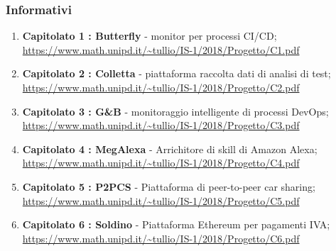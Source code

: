 			\subsubsection{Informativi}
				\begin{enumerate}
					\item \textbf{Capitolato 1 : Butterfly} - monitor per processi CI/CD;
						\newline
						\url{ https://www.math.unipd.it/~tullio/IS-1/2018/Progetto/C1.pdf}
					\item \textbf{Capitolato 2 : Colletta} - piattaforma raccolta dati di analisi di test;
						\newline
						\url{https://www.math.unipd.it/~tullio/IS-1/2018/Progetto/C2.pdf}
					\item \textbf{Capitolato 3 : G\&B} - monitoraggio intelligente di processi DevOps\pedice;
						\newline
						\url{https://www.math.unipd.it/~tullio/IS-1/2018/Progetto/C3.pdf}
					\item \textbf{Capitolato 4 : MegAlexa} - Arrichitore di skill di Amazon Alexa;
						\newline
						\url{https://www.math.unipd.it/~tullio/IS-1/2018/Progetto/C4.pdf}
					\item \textbf{Capitolato 5 : P2PCS} - Piattaforma di peer-to-peer car sharing; 
						\newline 
						\url{https://www.math.unipd.it/~tullio/IS-1/2018/Progetto/C5.pdf}
					\item \textbf{Capitolato 6 : Soldino} - Piattaforma Ethereum per pagamenti IVA;
						\newline 
						\url{https://www.math.unipd.it/~tullio/IS-1/2018/Progetto/C6.pdf}
            \end{enumerate}

